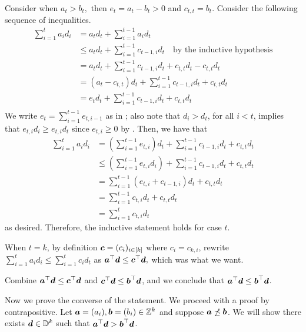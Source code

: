 \documentclass[runningheads]{llncs}
\begin{document}
\begin{proofof}{}
Consider when $a_t > b_t,$ then $e_t = a_t - b_t>0$ and $c_{t,t} = b_t$. Consider the following sequence of inequalities. 
\begin{equation}
    \begin{split}
       \sum_{i=1}^t a_i d_i  & = a_t d_t + \sum_{i=1}^{t-1} a_i d_t\\
       & \leq a_t d_t  + \sum_{i=1}^{t-1} c_{t-1, i} d_t \quad\text{by the inductive hypothesis}\\ 
       & =  a_t d_t  + \sum_{i=1}^{t-1} c_{t-1, i} d_t + c_{t,t} d_t - c_{t,t} d_t \\ 
       & = (a_t- c_{t,t}) d_t  + \sum_{i=1}^{t-1} c_{t-1, i} d_t + c_{t,t} d_t \\
       & = e_t d_t + \sum_{i=1}^{t-1} c_{t-1, i} d_t + c_{t,t} d_t \\
           \end{split}
\end{equation}
We write $e_{t} = \sum_{i=1}^{t-1}e_{t,i-1}$ as in ; 
also note that $d_i>d_t$, for all $i<t$, implies that $e_{t,i} d_i \geq e_{t,i}d_t$ since $e_{t,i}\geq0$ by . 
Then, we have that 
\begin{equation}
    \begin{split}
      \sum_{i=1}^t a_i d_i & = (\sum_{i=1}^{t-1} e_{t,i}) d_t+ \sum_{i=1}^{t-1} c_{t-1, i} d_t + c_{t,t} d_t \\
       & \leq  (\sum_{i=1}^{t-1} e_{t,i} d_i) +  \sum_{i=1}^{t-1} c_{t-1, i} d_t + c_{t,t} d_t \\
       & = \sum_{i=1}^{t-1} (e_{t,i} + c_{t-1, i}) d_t + c_{t,t} d_t \\
       & = \sum_{i=1}^{t-1} c_{t, i} d_t + c_{t,t} d_t \\
       & = \sum_{i=1}^{t} c_{t, i} d_t 
    \end{split}
\end{equation}
as desired. Therefore, the inductive statement holds for case $t$. 

When $t = k$, by definition $\boldsymbol c = (c_i)_{i\in[k]}$ where $c_{i} = c_{k,i}$, rewrite $\sum_{i=1}^t a_i d_i \leq \sum_{i=1}^{t} c_{i} d_t $ as $\boldsymbol a^\top\boldsymbol d\leq \boldsymbol c^\top\boldsymbol d,$ which was what we want.

Combine $\boldsymbol a^\top\boldsymbol d\leq\boldsymbol c^\top\boldsymbol d$ and $\boldsymbol c^\top\boldsymbol d\leq\boldsymbol b^\top\boldsymbol d$, and we conclude that $\boldsymbol a^\top\boldsymbol d\leq \boldsymbol b^\top\boldsymbol d$.

\thatway Now we prove the converse of the statement. We proceed with a proof by contrapositive. 
Let $\boldsymbol a = (a_i), \boldsymbol b = (b_i)\in\mathbb Z^k$ and suppose $\boldsymbol a\not\preceq\boldsymbol b$.
We will show there exists $\boldsymbol d\in\mathbb D^k$ such that 
$\boldsymbol a^\top\boldsymbol d > \boldsymbol b^\top\boldsymbol d$.


\end{proofof}
\end{document}
